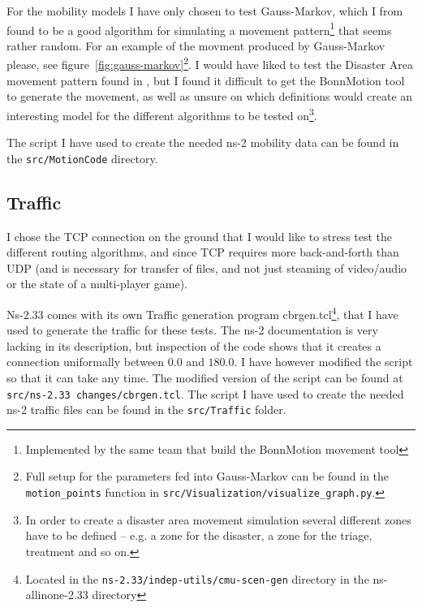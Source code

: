 

For the mobility models I have only chosen to test Gauss-Markov, which I from \cite{MobilityAdHocResearch} found to be a good algorithm for simulating a movement pattern\footnote{Implemented by the same team that build the BonnMotion movement tool} that seems rather random. For an example of the movment produced by Gauss-Markov please, see figure~\ref{fig:gauss-markov}\footnote{Full setup for the parameters fed into Gauss-Markov can be found in the \texttt{motion\_points} function in \texttt{src/Visualization/visualize\_graph.py}.}. I would have liked to test the Disaster Area movement pattern found in \cite{disasterArea}, but I found it difficult to get the BonnMotion tool to generate the movement, as well as unsure on which definitions would create an interesting model for the different algorithms to be tested on\footnote{In order to create a disaster area movement simulation several different zones have to be defined -- e.g. a zone for the disaster, a zone for the triage, treatment and so on.}. 

The script I have used to create the needed ns-2 mobility data can be found in the \texttt{src/MotionCode} directory.

\subsection{Traffic}
\label{section:traffic_model}
I chose the TCP connection on the ground that I would like to stress test the different routing algorithms, and since TCP requires more back-and-forth than UDP (and is necessary for transfer of files, and not just steaming of video/audio or the state of a multi-player game).

Ns-2.33 comes with its own Traffic generation program cbrgen.tcl\footnote{Located in the \texttt{ns-2.33/indep-utils/cmu-scen-gen} directory in the ns-allinone-2.33 directory}, that I have used to generate the traffic for these tests. The ns-2 documentation is very lacking in its description, but inspection of the code shows that it creates a connection uniformally between $0.0$ and $180.0$. I have however modified the script so that it can take any time. The modified version of the script can be found at \texttt{src/ns-2.33 changes/cbrgen.tcl}. The script I have used to create the needed ns-2 traffic files can be found in the \texttt{src/Traffic} folder.

